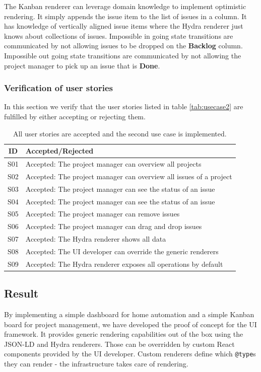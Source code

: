 The Kanban renderer can leverage domain knowledge to implement optimistic rendering. It simply appends the issue item to the list of issues in a column. It has knowledge of vertically aligned issue items where the Hydra renderer just knows about collections of issues. Impossible in going state transitions are communicated by not allowing issues to be dropped on the \textbf{Backlog} column. Impossible out going state transitions are communicated by not allowing the project manager to pick up an issue that is \textbf{Done}.

\subsubsection{Verification of user stories}
In this section we verify that the user stories listed in table \ref{tab:usecase2} are fulfilled by either accepting or rejecting them.

\begin{table}
  \begin{center}
    \begin{tabular}{ |c|l| }
      \hline
      ID & Accepted/Rejected \\
      \hline
      S01 & Accepted: The project manager can overview all projects \\
      S02 & Accepted: The project manager can overview all issues of a project \\
      S03 & Accepted: The project manager can see the status of an issue \\
      S04 & Accepted: The project manager can see the status of an issue \\
      S05 & Accepted: The project manager can remove issues \\
      S06 & Accepted: The project manager can drag and drop issues \\
      S07 & Accepted: The Hydra renderer shows all data \\
      S08 & Accepted: The UI developer can override the generic renderers \\
      S09 & Accepted: The Hydra renderer exposes all operations by default \\
      \hline
    \end{tabular}
    \caption{All user stories are accepted and the second use case is implemented.}
  \end{center}
\end{table}

\subsection{Result}
By implementing a simple dashboard for home automation and a simple Kanban board for project management, we have developed the proof of concept for the UI framework. It provides generic rendering capabilities out of the box using the JSON-LD and Hydra renderers. Those can be overridden by custom React components provided by the UI developer. Custom renderers define which \lstinline{@type}s they can render - the infrastructure takes care of rendering.

